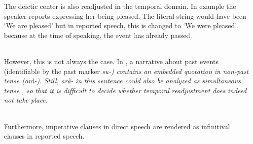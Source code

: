 The deictic center is also readjusted in the temporal domain. In example  the speaker reports expressing her being pleased. The literal string would have been `We are pleased' but in reported speech, this is changed to `We were pleased', because at the time of speaking, the event has already passed.


 \\

However, this is not always the case. In , a narrative about past events (identifiable by the past marker \em su-\em) contains an embedded quotation in non-past tense (\em arà-\em). Still, \em arà- \em in this sentence could also be analyzed as simultaneous tense , so that it is difficult to decide whether temporal readjustment does indeed not take place.


 \\


Furthermore, imperative clauses in direct speech are rendered as infinitival clauses in reported speech.


 \\
 

 






